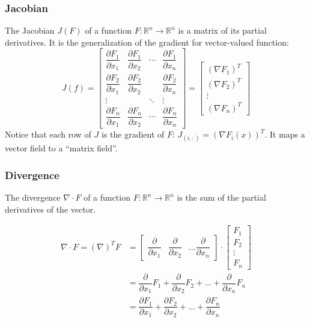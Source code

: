 \documentclass{article}
\begin{document}
\subsubsection{Jacobian}
The Jacobian $J(F)$ of a function $ F: \mathbb{R}^n \longrightarrow \mathbb{R}^n $
is a matrix of its partial derivatives. It is the generalization of the gradient
for vector-valued function:
\[
    J(f)=
    \begin{bmatrix}
        \dfrac{\partial F_1}{\partial x_1} &
        \dfrac{\partial F_1}{\partial x_2} &
        \cdots &
        \dfrac{\partial F_1}{\partial x_n} \\ 
        \dfrac{\partial F_2}{\partial x_1} &
        \dfrac{\partial F_2}{\partial x_2} &   &
        \dfrac{\partial F_2}{\partial x_n} \\ 
        \vdots &  & \ddots & \vdots \\ 
        \dfrac{\partial F_n}{\partial x_1} &
        \dfrac{\partial F_n}{\partial x_2} &
        \cdots &
        \dfrac{\partial F_n}{\partial x_n}
    \end{bmatrix} = 
    \begin{bmatrix}
        (\nabla F_1)^T \\ (\nabla F_2)^T  \\ \vdots \\ (\nabla F_n)^T 
    \end{bmatrix} 
\]
Notice that each row of $J$ is the gradient of $F$: $J_{(i, :)} = (\nabla
F_i(x))^T $. It maps a vector field to a ``matrix field''.
\subsubsection{Divergence}
The divergence $\nabla \cdot F$ of a function $ F: \mathbb{R}^n \longrightarrow
\mathbb{R}^n $ is the sum of the partial derivatives of the vector.

\begin{align*}
\nabla \cdot F = (\nabla)^T  F &=
\begin{bmatrix}
        \dfrac{\partial }{\partial x_1} & 
        \dfrac{\partial }{\partial x_2} &
        \hdots
        \dfrac{\partial }{\partial x_n}
    \end{bmatrix} \cdot
    \begin{bmatrix}
        F_1 \\
        F_2 \\
        \vdots \\
        F_n
    \end{bmatrix} \\ &= 
    \dfrac{\partial }{\partial x_1} F_1 +
    \dfrac{\partial }{\partial x_2} F_2 +
    \hdots +
    \dfrac{\partial }{\partial x_n} F_n \\ &= 
    \dfrac{\partial F_1}{\partial x_1} + 
    \dfrac{\partial F_2}{\partial x_2} + 
    \hdots +
    \dfrac{\partial F_n}{\partial x_n}
\end{align*}
\end{document}
